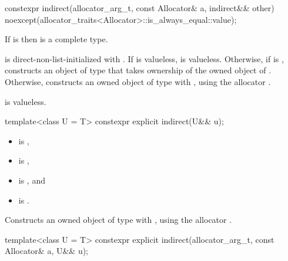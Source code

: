 %
\begin{itemdecl}
constexpr indirect(allocator_arg_t, const Allocator& a, indirect&& other)
  noexcept(allocator_traits<Allocator>::is_always_equal::value);
\end{itemdecl}

\begin{itemdescr}
\pnum
\mandates
If  is 
then  is a complete type.

\pnum
\effects
{} is direct-non-list-initialized with .
If  is valueless,  is valueless.
Otherwise,
if  is ,
constructs an object of type  that
takes ownership of the owned object of .
Otherwise,
constructs an owned object of type  with ,
using the allocator .

\pnum
\ensures
{} is valueless.
\end{itemdescr}

%
\begin{itemdecl}
template<class U = T>
  constexpr explicit indirect(U&& u);
\end{itemdecl}

\begin{itemdescr}
\pnum
\constraints
\begin{itemize}
\item
{} is ,
\item
{} is ,
\item
{} is , and
\item
{} is .
\end{itemize}

\pnum
\effects
Constructs an owned object of type  with ,
using the allocator .
\end{itemdescr}

%
\begin{itemdecl}
template<class U = T>
  constexpr explicit indirect(allocator_arg_t, const Allocator& a, U&& u);
\end{itemdecl}

